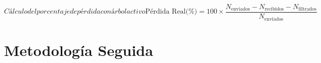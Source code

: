 \begin{equation}[eq:perdida arbor]{Cálculo del porcentaje de pérdida con árbol activo}
  \text{Pérdida Real(\%)} = 100 \times \frac{N_{\text{enviados}} - N_{\text{recibidos}} - N_{\text{filtrados}}}{N_{\text{enviados}}}
\end{equation}

\section{Metodología Seguida}
